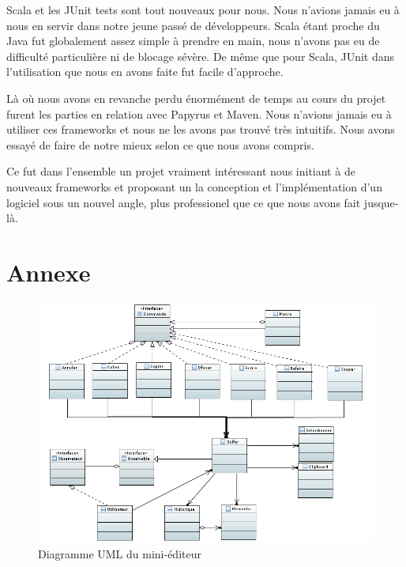 \documentclass[a4paper,11pt]{article}
\begin{document}
\noindent Scala et les JUnit tests sont tout nouveaux pour nous. Nous n'avions jamais eu à nous en servir dans notre jeune passé de développeurs. Scala étant proche du Java fut globalement assez simple à prendre en main, nous n'avons pas eu de difficulté particulière ni de blocage sévère. De même que pour Scala, JUnit dans l'utilisation que nous en avons faite fut facile d'approche.
\bigskip

\noindent Là où nous avons en revanche perdu énormément de temps au cours du projet furent les parties en relation avec Papyrus et Maven. Nous n'avions jamais eu à utiliser ces frameworks et nous ne les avons pas trouvé très intuitifs. Nous avons essayé de faire de notre mieux selon ce que nous avons compris.
\bigskip

Ce fut dans l'ensemble un projet vraiment intéressant nous initiant à de nouveaux frameworks et proposant un la conception et l'implémentation d'un logiciel sous un nouvel angle, plus professionel que ce que nous avons fait jusque-là.

\bigskip
\bigskip

\clearpage

%
%

\section{Annexe}\label{sec:annexe}
\bigskip

\begin{figure}[h!]
   \centerline{\includegraphics[angle=90, scale=1]{DiagrammeGlobal.png}}
   \caption{\label{diaEditeur} Diagramme UML du mini-éditeur}
\end{figure}

\clearpage

%
%
\end{document}
